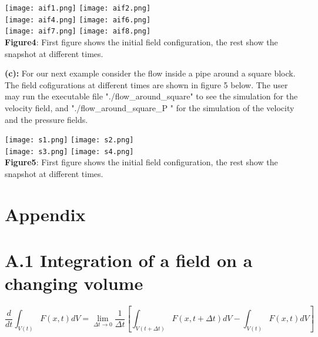 \documentclass{article}		%
\begin{document}
\begin{center}
	\texttt{[image: aif1.png]}
	\texttt{[image: aif2.png]}\\
    \texttt{[image: aif4.png]}		
	\texttt{[image: aif6.png]}\\		
	\texttt{[image: aif7.png]}		
	\texttt{[image: aif8.png]}\\		
			
	\textbf{Figure4}: First figure shows the initial field configuration, the rest show the snapshot at different times.
\end{center}



\textbf{(c):} For our next example consider the flow inside a pipe around a square block. The field cofigurations at different times are shown in figure 5 below. The user may run the executable file "./flow\_around\_square" to see the simulation for the velocity field, and "./flow\_around\_square\_P " for the simulation of the velocity and the pressure fields.


\begin{center}
	\texttt{[image: s1.png]}
	\texttt{[image: s2.png]}\\
	\texttt{[image: s3.png]}		
	\texttt{[image: s4.png]}\\			
	\textbf{Figure5}: First figure shows the initial field configuration, the rest show the snapshot at different times. 
\end{center}




\newpage 



\section*{Appendix}
 \section*{ A.1 Integration of a field on a changing volume} \label{a1}
		
		$$
		\frac{d}{dt} \int_{V(t)} F(x,t) dV = \lim_{\Delta t \to 0} \frac{1}{\Delta t} \left[  \int_{V(t+\Delta t)} F(x,t+\Delta t) dV -  \int_{V(t)} F(x,t) dV \right]
		$$
		
\end{document}
